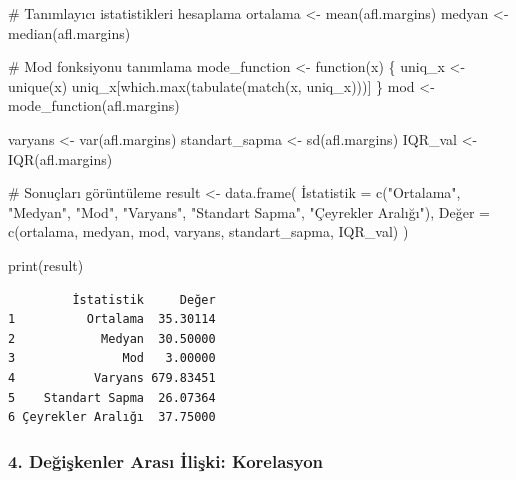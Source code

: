 \documentclass[
  letterpaper,
  DIV=11,
  numbers=noendperiod]{scrartcl}
\newenvironment{Shaded}{\begin{snugshade}}{\end{snugshade}}
\newcommand{\AttributeTok}[1]{\textcolor[rgb]{0.40,0.45,0.13}{#1}}
\newcommand{\CommentTok}[1]{\textcolor[rgb]{0.37,0.37,0.37}{#1}}
\newcommand{\ControlFlowTok}[1]{\textcolor[rgb]{0.00,0.23,0.31}{#1}}
\newcommand{\FunctionTok}[1]{\textcolor[rgb]{0.28,0.35,0.67}{#1}}
\newcommand{\NormalTok}[1]{\textcolor[rgb]{0.00,0.23,0.31}{#1}}
\newcommand{\OtherTok}[1]{\textcolor[rgb]{0.00,0.23,0.31}{#1}}
\newcommand{\StringTok}[1]{\textcolor[rgb]{0.13,0.47,0.30}{#1}}
\begin{document}
\begin{Shaded}
\begin{Highlighting}[]
\CommentTok{\# Tanımlayıcı istatistikleri hesaplama}
\NormalTok{ortalama }\OtherTok{\textless{}{-}} \FunctionTok{mean}\NormalTok{(afl.margins)}
\NormalTok{medyan }\OtherTok{\textless{}{-}} \FunctionTok{median}\NormalTok{(afl.margins)}

\CommentTok{\# Mod fonksiyonu tanımlama}
\NormalTok{mode\_function }\OtherTok{\textless{}{-}} \ControlFlowTok{function}\NormalTok{(x) \{}
\NormalTok{  uniq\_x }\OtherTok{\textless{}{-}} \FunctionTok{unique}\NormalTok{(x)}
\NormalTok{  uniq\_x[}\FunctionTok{which.max}\NormalTok{(}\FunctionTok{tabulate}\NormalTok{(}\FunctionTok{match}\NormalTok{(x, uniq\_x)))]}
\NormalTok{\}}
\NormalTok{mod }\OtherTok{\textless{}{-}} \FunctionTok{mode\_function}\NormalTok{(afl.margins)}

\NormalTok{varyans }\OtherTok{\textless{}{-}} \FunctionTok{var}\NormalTok{(afl.margins)}
\NormalTok{standart\_sapma }\OtherTok{\textless{}{-}} \FunctionTok{sd}\NormalTok{(afl.margins)}
\NormalTok{IQR\_val }\OtherTok{\textless{}{-}} \FunctionTok{IQR}\NormalTok{(afl.margins)}

\CommentTok{\# Sonuçları görüntüleme}
\NormalTok{result }\OtherTok{\textless{}{-}} \FunctionTok{data.frame}\NormalTok{(}
\NormalTok{  İ}\AttributeTok{statistik =} \FunctionTok{c}\NormalTok{(}\StringTok{"Ortalama"}\NormalTok{, }\StringTok{"Medyan"}\NormalTok{, }\StringTok{"Mod"}\NormalTok{, }\StringTok{"Varyans"}\NormalTok{, }\StringTok{"Standart Sapma"}\NormalTok{, }\StringTok{"Çeyrekler Aralığı"}\NormalTok{),}
\NormalTok{  Değer }\OtherTok{=} \FunctionTok{c}\NormalTok{(ortalama, medyan, mod, varyans, standart\_sapma, IQR\_val)}
\NormalTok{)}

\FunctionTok{print}\NormalTok{(result)}
\end{Highlighting}
\end{Shaded}

\begin{verbatim}
         İstatistik     Değer
1          Ortalama  35.30114
2            Medyan  30.50000
3               Mod   3.00000
4           Varyans 679.83451
5    Standart Sapma  26.07364
6 Çeyrekler Aralığı  37.75000
\end{verbatim}

\hypertarget{deux11fiux15fkenler-arasux131-iliux15fki-korelasyon}{%
\subsubsection{4. Değişkenler Arası İlişki:
Korelasyon}\label{deux11fiux15fkenler-arasux131-iliux15fki-korelasyon}}
\end{document}
